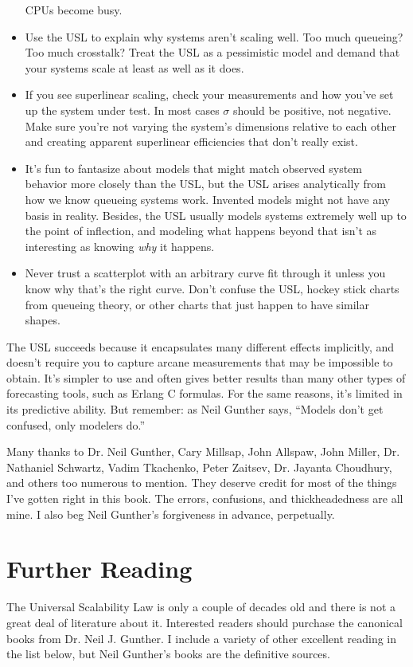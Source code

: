 \documentclass{vivid_layout}
\begin{document}
\begin{itemize}
CPUs become busy.
\item Use the USL to explain why systems aren't scaling well. Too much queueing?
Too much crosstalk? Treat the USL as a pessimistic model and demand that your
systems scale at least as well as it does.
\item If you see superlinear scaling, check your measurements and how you've set
up the system under test. In most cases $\sigma$ should be positive, not
negative. Make sure you're not varying the system's dimensions relative to each
other and creating apparent superlinear efficiencies that don't really exist.
\item It's fun to fantasize about models that might match observed system
behavior more closely than the USL, but the USL arises analytically from how we
know queueing systems work. Invented models might not have any basis in reality.
Besides, the USL usually models systems extremely well up to the point of
inflection, and modeling what happens beyond that isn't as interesting as
knowing {\itshape why} it happens.
\item Never trust a scatterplot with an arbitrary curve fit through it unless
you know why that's the right curve. Don't confuse the USL, hockey stick charts
from queueing theory, or other charts that just happen to have similar shapes.
\end{itemize}

The USL succeeds because it encapsulates many different effects implicitly, and
doesn't require you to capture arcane measurements that may be impossible to
obtain. It's simpler to use and often gives better results than many other types of
forecasting tools, such as Erlang C formulas. For the same reasons, it's limited
in its predictive ability. But remember: as Neil Gunther says, ``Models don't
get confused, only modelers do.''

Many thanks to Dr. Neil Gunther, Cary Millsap, John Allspaw, John Miller, Dr.
Nathaniel Schwartz, Vadim Tkachenko, Peter Zaitsev, Dr. Jayanta Choudhury, and
others too numerous to mention. They deserve credit for most of the things I've
gotten right in this book. The errors, confusions, and thickheadedness are all
mine. I also beg Neil Gunther's forgiveness in advance, perpetually.

\section{Further Reading}

The Universal Scalability Law is only a couple of decades old and there is not a
great deal of literature about it. Interested readers should purchase the
canonical books from Dr. Neil J. Gunther. I include a variety of other excellent
reading in the list below, but Neil Gunther's books are the definitive sources.
\end{document}
